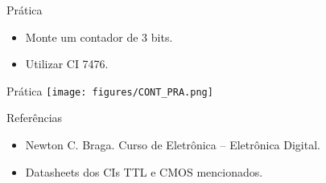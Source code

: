 \documentclass{beamer}
\begin{document}
\begin{frame}{Prática}
\begin{itemize}
  \item Monte um contador de 3 bits.
  \item Utilizar CI 7476.
\end{itemize}
\end{frame}

\begin{frame}{Prática}
\centering
\texttt{[image: figures/CONT\_PRA.png]}
\end{frame}

\begin{frame}{Referências}
\begin{itemize}
  \item Newton C. Braga. Curso de Eletrônica – Eletrônica Digital.
  \item Datasheets dos CIs TTL e CMOS mencionados.
\end{itemize}
\end{frame}
\end{document}
